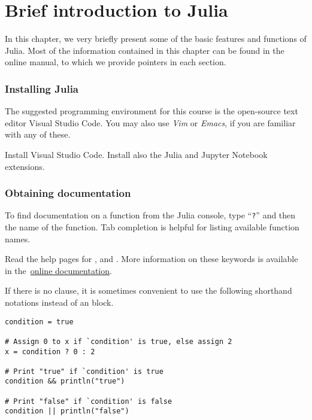 \chapter{Brief introduction to Julia}%
\label{cha:a_very_short_introduction_to_julia}

In this chapter,
we very briefly present  some of the basic features and functions of Julia.
Most of the information contained in this chapter can be found in the online manual,
to which we provide pointers in each section.

\subsection*{Installing Julia}%
\label{sub:installing_julia}
The suggested programming environment for this course is the open-source text editor Visual Studio Code.
You may also use \emph{Vim} or \emph{Emacs},
if you are familiar with any of these.

\begin{task}
    Install Visual Studio Code.
    Install also the Julia and Jupyter Notebook extensions.
\end{task}

\subsection*{Obtaining documentation}%
\label{sub:getting_documentation}

To find documentation on a function from the Julia console,
type ``\texttt{?}'' and then the name of the function.
Tab completion is helpful for listing available function names.

\begin{task}
    Read the help pages for ,  and .
    More information on these keywords is available in the~\href{https://docs.julialang.org/en/v1/manual/control-flow/} {online documentation}.
\end{task}


\begin{remark}
If there is no  clause,
it is sometimes convenient to use the following shorthand notations instead of an  block.
\begin{verbatim}
condition = true

# Assign 0 to x if `condition' is true, else assign 2
x = condition ? 0 : 2

# Print "true" if `condition' is true
condition && println("true")

# Print "false" if `condition' is false
condition || println("false")
\end{verbatim}
\end{remark}

